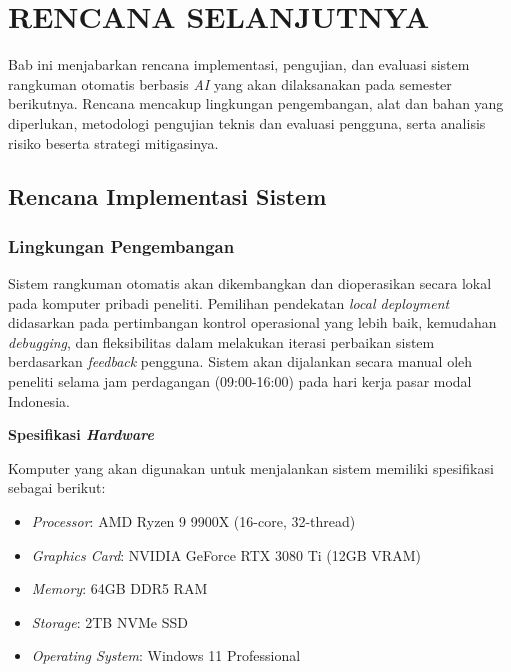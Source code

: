 \chapter{RENCANA SELANJUTNYA}
\label{chap:rencana-selanjutnya}

Bab ini menjabarkan rencana implementasi, pengujian, dan evaluasi sistem rangkuman otomatis berbasis \textit{AI} yang akan dilaksanakan pada semester berikutnya. Rencana mencakup lingkungan pengembangan, alat dan bahan yang diperlukan, metodologi pengujian teknis dan evaluasi pengguna, serta analisis risiko beserta strategi mitigasinya.

\section{Rencana Implementasi Sistem}
\label{sec:rencana-implementasi}

\subsection{Lingkungan Pengembangan}

Sistem rangkuman otomatis akan dikembangkan dan dioperasikan secara lokal pada komputer pribadi peneliti. Pemilihan pendekatan \textit{local deployment} didasarkan pada pertimbangan kontrol operasional yang lebih baik, kemudahan \textit{debugging}, dan fleksibilitas dalam melakukan iterasi perbaikan sistem berdasarkan \textit{feedback} pengguna. Sistem akan dijalankan secara manual oleh peneliti selama jam perdagangan (09:00-16:00) pada hari kerja pasar modal Indonesia.

\textbf{Spesifikasi \textit{Hardware}}

Komputer yang akan digunakan untuk menjalankan sistem memiliki spesifikasi sebagai berikut:
\begin{itemize}
\item \textit{Processor}: AMD Ryzen 9 9900X (16-core, 32-thread)
\item \textit{Graphics Card}: NVIDIA GeForce RTX 3080 Ti (12GB VRAM)
\item \textit{Memory}: 64GB DDR5 RAM
\item \textit{Storage}: 2TB NVMe SSD
\item \textit{Operating System}: Windows 11 Professional
\end{itemize}

